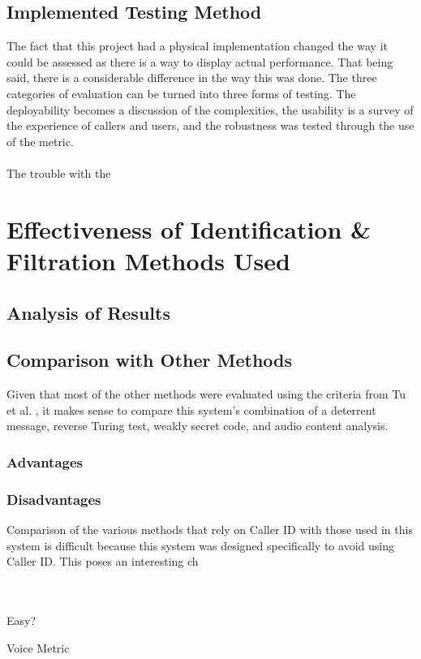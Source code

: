 \documentclass[main.tex]{subfiles}
\begin{document}
\subsection{Implemented Testing Method}
The fact that this project had a physical implementation changed the way it could be assessed as there is a way to display actual performance. That being said, there is a considerable difference in the way this was done. The three categories of evaluation can be turned into three forms of testing. The deployability becomes a discussion of the complexities, the usability is a survey of the experience of callers and users, and the robustness was tested through the use of the metric.
\\\\
The trouble with the


\section{Effectiveness of Identification \& Filtration Methods Used}
\subsection{Analysis of Results}
\subsection{Comparison with Other Methods}
Given that most of the other methods were evaluated using the criteria from Tu et al. \cite{cisco}, it makes sense to compare this system's combination of a deterrent message, reverse Turing test, weakly secret code, and audio content analysis.


\subsubsection{Advantages}
\subsubsection{Disadvantages}

Comparison of the various methods that rely on Caller ID with those used in this system is difficult because this system was designed specifically to avoid using Caller ID. This poses an interesting ch

\hrulefill
\\\\

Easy?

Voice Metric
\end{document}
